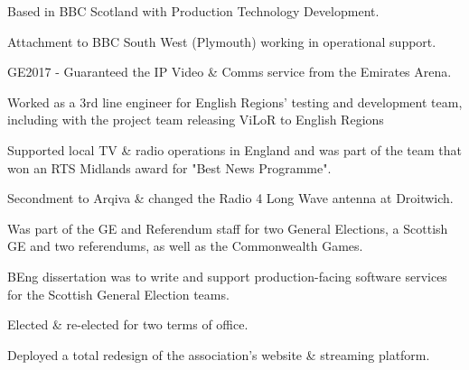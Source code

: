 \documentclass[]{deedy-resume-openfont}
\begin{document}
\begin{minipage}[t]{0.66\textwidth}
\begin{tightemize}
\item Based in BBC Scotland with Production Technology Development.
\item Attachment to BBC South West (Plymouth) working in operational support.
\item GE2017 - Guaranteed the IP Video \& Comms service from the Emirates Arena.
\end{tightemize}
\sectionsep

\begin{tightemize}
\item Worked as a 3rd line engineer for English Regions' testing and development team, including with the project team releasing ViLoR to English Regions
\item Supported local TV \& radio operations in England and was part of the team that won an RTS Midlands award for "Best News Programme".
\item Secondment to Arqiva \& changed the Radio 4 Long Wave antenna at Droitwich.
\item Was part of the GE and Referendum staff for two General Elections, a Scottish GE and two referendums, as well as the Commonwealth Games.
\item BEng dissertation was to write and support production-facing software services for the Scottish General Election teams.
\end{tightemize}
\sectionsep

\begin{tightemize}
\item Elected \& re-elected for two terms of office.
\item Deployed a total redesign of the association's website \& streaming platform.
\end{tightemize}
\sectionsep

\end{minipage} 
\end{document}
